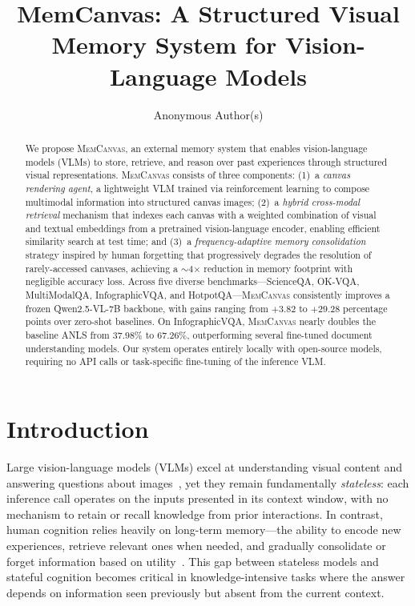 \documentclass{article}
\title{MemCanvas: A Structured Visual Memory System for Vision-Language Models}
\author{%
  Anonymous Author(s)
}
\newcommand{\memcanvas}{\textsc{MemCanvas}}
\begin{document}
\maketitle

\begin{abstract}
We propose \memcanvas{}, an external memory system that enables vision-language models (VLMs) to store, retrieve, and reason over past experiences through structured visual representations.
\memcanvas{} consists of three components: (1)~a \emph{canvas rendering agent}, a lightweight VLM trained via reinforcement learning to compose multimodal information into structured canvas images; (2)~a \emph{hybrid cross-modal retrieval} mechanism that indexes each canvas with a weighted combination of visual and textual embeddings from a pretrained vision-language encoder, enabling efficient similarity search at test time; and (3)~a \emph{frequency-adaptive memory consolidation} strategy inspired by human forgetting that progressively degrades the resolution of rarely-accessed canvases, achieving a $\sim$4$\times$ reduction in memory footprint with negligible accuracy loss.
Across five diverse benchmarks---ScienceQA, OK-VQA, MultiModalQA, InfographicVQA, and HotpotQA---\memcanvas{} consistently improves a frozen Qwen2.5-VL-7B backbone, with gains ranging from $+3.82$ to $+29.28$ percentage points over zero-shot baselines. On InfographicVQA, \memcanvas{} nearly doubles the baseline ANLS from $37.98\%$ to $67.26\%$, outperforming several fine-tuned document understanding models. Our system operates entirely locally with open-source models, requiring no API calls or task-specific fine-tuning of the inference VLM.
\end{abstract}

\section{Introduction}
\label{sec:intro}

Large vision-language models (VLMs) excel at understanding visual content and answering questions about images~\citep{bai2025qwen25vl, chen2024internvl}, yet they remain fundamentally \emph{stateless}: each inference call operates on the inputs presented in its context window, with no mechanism to retain or recall knowledge from prior interactions. In contrast, human cognition relies heavily on long-term memory---the ability to encode new experiences, retrieve relevant ones when needed, and gradually consolidate or forget information based on utility~\citep{ebbinghaus1885memory}. This gap between stateless models and stateful cognition becomes critical in knowledge-intensive tasks where the answer depends on information seen previously but absent from the current context.
\end{document}
